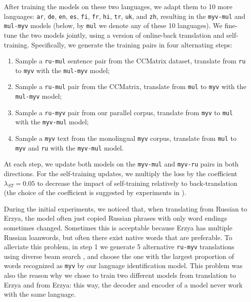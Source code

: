 \documentclass[11pt]{article}
\begin{document}
After training the models on these two languages, we adapt them to 10 more languages: \texttt{ar}, \texttt{de}, \texttt{en}, \texttt{es}, \texttt{fi}, \texttt{fr}, \texttt{hi}, \texttt{tr}, \texttt{uk}, and \texttt{zh}, resulting in the \texttt{myv-mul} and \texttt{mul-myv} models (below, by \texttt{mul} we denote any of these 10 languages). We fine-tune the two models jointly, using a version of online-back translation and self-training. Specifically, we generate the training pairs in four alternating steps:
\begin{enumerate}
    \item Sample a \texttt{ru-mul} sentence pair from the CCMatrix \cite{schwenk-etal-2021-ccmatrix} dataset, translate from \texttt{ru} to \texttt{myv} with the \texttt{mul-myv} model;
    \item Sample a \texttt{ru-mul} pair from the CCMatrix, translate from \texttt{mul} to \texttt{myv} with the \texttt{mul-myv} model;
    \item Sample a \texttt{ru-myv} pair from our parallel corpus, translate from \texttt{myv} to \texttt{mul} with the \texttt{myv-mul} model;
    \item Sample a \texttt{myv} text from the monolingual \texttt{myv} corpus, translate from \texttt{mul} to \texttt{myv} and \texttt{ru} with the \texttt{myv-mul} model.
\end{enumerate}
At each step, we update both models on the \texttt{myv-mul} and \texttt{myv-ru} pairs in both directions. For the self-training updates, we multiply the loss by the coefficient $\lambda_{ST}=0.05$ to decrease the impact of self-training relatively to back-translation (the choice of the coefficient is suggested by experiments in \citet{he-etal-2022-bridging}).

During the initial experiments, we noticed that, when translating from Russian to Erzya, the model often just copied Russian phrases with only word endings sometimes changed. Sometimes this is acceptable because Erzya has multiple Russian loanwords, but often there exist native words that are preferable. To alleviate this problem, in step 1 we generate 5 alternative \texttt{ru-myv} translations using diverse beam search \cite{vijayakumar2016diverse}, and choose the one with the largest proportion of words recognized as \texttt{myv} by our language identification model. This problem was also the reason why we chose to train two different models from translation to Erzya and from Erzya: this way, the decoder and encoder of a model never work with the same language.
\end{document}
